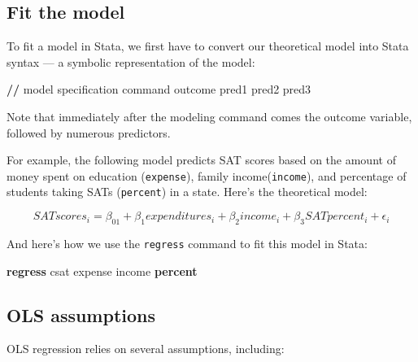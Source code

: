 \documentclass[
]{book}
\newenvironment{Shaded}{\begin{snugshade}}{\end{snugshade}}
\newcommand{\ErrorTok}[1]{\textcolor[rgb]{0.64,0.00,0.00}{\textbf{#1}}}
\newcommand{\KeywordTok}[1]{\textcolor[rgb]{0.13,0.29,0.53}{\textbf{#1}}}
\newcommand{\NormalTok}[1]{#1}
\newcommand{\OperatorTok}[1]{\textcolor[rgb]{0.81,0.36,0.00}{\textbf{#1}}}
\newcommand{\StringTok}[1]{\textcolor[rgb]{0.31,0.60,0.02}{#1}}
\begin{document}
\hypertarget{fit-the-model}{%
\subsection{Fit the model}\label{fit-the-model}}

To fit a model in Stata, we first have to convert our theoretical model into
Stata syntax --- a symbolic representation of the model:

\begin{Shaded}
\begin{Highlighting}[]
\OperatorTok{/}\ErrorTok{/}\StringTok{ }\NormalTok{model specification}
\NormalTok{command outcome pred1 pred2 pred3}
\end{Highlighting}
\end{Shaded}

Note that immediately after the modeling command comes the outcome variable, followed by numerous predictors.

For example, the following model predicts SAT scores based on the amount of money spent on education (\texttt{expense}), family income(\texttt{income}), and percentage of students taking SATs (\texttt{percent}) in a state. Here's the theoretical model:

\begin{alert}

\[
SATscores_i = \beta_01 + \beta_1expenditures_i + \beta_2income_i +\beta_3SATpercent_i + \epsilon_i
\]

\end{alert}

And here's how we use the \texttt{regress} command to fit this model in Stata:

\begin{Shaded}
\begin{Highlighting}[]
\KeywordTok{regress}\NormalTok{ csat expense income }\KeywordTok{percent} 
\end{Highlighting}
\end{Shaded}

\hypertarget{ols-assumptions}{%
\subsection{OLS assumptions}\label{ols-assumptions}}

OLS regression relies on several assumptions, including:
\end{document}
